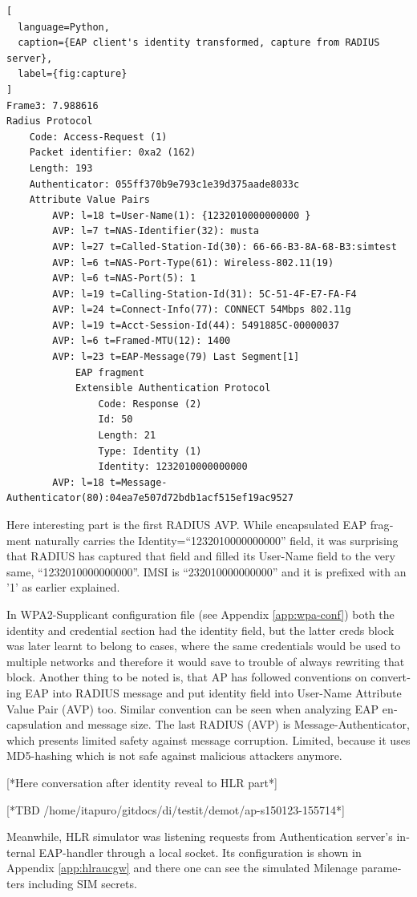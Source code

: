 \documentclass[12pt,a4paper,english]{tutthesis}
\begin{document}
\begin{otherlanguage}{english}
\begin{lstlisting}[
  language=Python,
  caption={EAP client's identity transformed, capture from RADIUS server},
  label={fig:capture}
]
Frame3: 7.988616
Radius Protocol
    Code: Access-Request (1)
    Packet identifier: 0xa2 (162)
    Length: 193
    Authenticator: 055ff370b9e793c1e39d375aade8033c
    Attribute Value Pairs
        AVP: l=18 t=User-Name(1): {1232010000000000 }
        AVP: l=7 t=NAS-Identifier(32): musta
        AVP: l=27 t=Called-Station-Id(30): 66-66-B3-8A-68-B3:simtest
        AVP: l=6 t=NAS-Port-Type(61): Wireless-802.11(19)
        AVP: l=6 t=NAS-Port(5): 1
        AVP: l=19 t=Calling-Station-Id(31): 5C-51-4F-E7-FA-F4
        AVP: l=24 t=Connect-Info(77): CONNECT 54Mbps 802.11g
        AVP: l=19 t=Acct-Session-Id(44): 5491885C-00000037
        AVP: l=6 t=Framed-MTU(12): 1400
        AVP: l=23 t=EAP-Message(79) Last Segment[1]
            EAP fragment
            Extensible Authentication Protocol
                Code: Response (2)
                Id: 50
                Length: 21
                Type: Identity (1)
                Identity: 1232010000000000
        AVP: l=18 t=Message-Authenticator(80):04ea7e507d72bdb1acf515ef19ac9527
\end{lstlisting}
\normalsize


Here interesting part is the first RADIUS AVP.
While encapsulated EAP fragment naturally carries the Identity=``1232010000000000''
field, it was surprising that RADIUS has captured that field and 
filled its User-Name field to the very same, ``1232010000000000''. 
IMSI is ``232010000000000'' and it is prefixed with
an '1' as earlier explained.

In WPA2-Supplicant configuration file (see Appendix \ref{app:wpa-conf}) both the identity and
credential section had the identity field, but the latter creds block
was later learnt to belong to cases, where the same credentials would
be used to multiple networks and therefore it would save to trouble of
always rewriting that block.
Another thing to be noted is, that AP has followed conventions on
converting EAP into RADIUS message and put identity field into
User-Name Attribute Value Pair (AVP) too.
Similar convention can be seen when analyzing EAP encapsulation and
message size. The last RADIUS (AVP) is 
Message-Authenticator, which presents limited safety against message 
corruption. Limited, because it uses MD5-hashing which is not safe
against malicious attackers anymore.

[*Here conversation after identity reveal to HLR part*]

[*TBD /home/itapuro/gitdocs/di/testit/demot/ap-s150123-155714*]

Meanwhile, HLR simulator was listening requests from Authentication
server's internal EAP-handler through a local socket. 
Its configuration is shown in
Appendix \ref{app:hlraucgw} and there one can see the simulated Milenage parameters including SIM secrets.




\end{otherlanguage}
\end{document}
